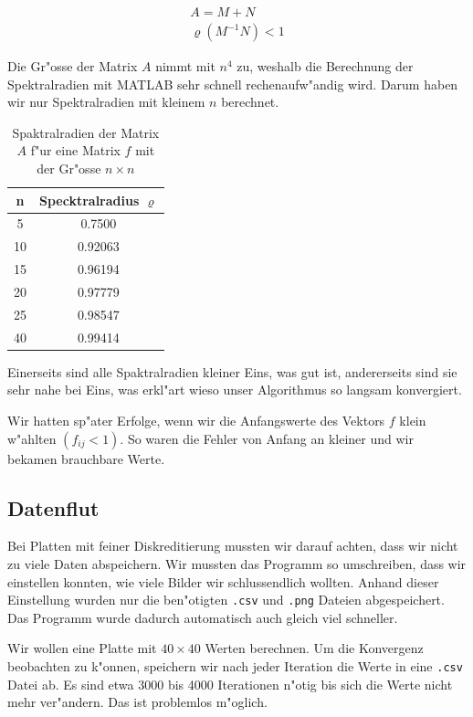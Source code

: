 \begin{refsection}
\begin{eqnarray}
A = M+N\\
\varrho(M^{-1}N)<1
\end{eqnarray}
		
Die Gr"osse der Matrix $A$ nimmt mit $n^4$ zu, weshalb die Berechnung
der Spektralradien mit MATLAB sehr schnell rechenaufw"andig wird.
Darum haben wir nur Spektralradien mit kleinem $n$ berechnet.
		
\begin{table}
\begin{tabular}{cc}
n & Specktralradius $\varrho$\\\hline
5 & 0.7500\\
10 & 0.92063\\
15 & 0.96194\\
20 & 0.97779\\
25 & 0.98547\\
40 & 0.99414
\end{tabular}
\centering
\caption{Spaktralradien der Matrix $A$ f"ur eine Matrix $f$ mit der Gr"osse $n\times n$}
\end{table}
	
Einerseits sind alle Spaktralradien kleiner Eins, was gut ist,
andererseits sind sie sehr nahe bei Eins, was erkl"art wieso unser
Algorithmus so langsam konvergiert.
		
Wir hatten sp"ater Erfolge, wenn wir die Anfangswerte des Vektors
$f$ klein w"ahlten $(f_{ij}<1)$. So waren die Fehler von Anfang an
kleiner und wir bekamen brauchbare Werte.
	
\subsection{Datenflut}
	
Bei Platten mit feiner Diskreditierung mussten wir darauf achten,
dass wir nicht zu viele Daten abspeichern. Wir mussten das Programm
so umschreiben, dass wir einstellen konnten, wie viele Bilder wir
schlussendlich wollten. Anhand dieser Einstellung wurden nur
die ben"otigten \texttt{.csv} und \texttt{.png} Dateien abgespeichert.
Das Programm wurde dadurch automatisch auch gleich viel schneller.
		
\begin{beispiel}
Wir wollen eine Platte mit  $40 \times 40$ Werten berechnen. Um die
Konvergenz beobachten zu k"onnen, speichern wir nach jeder Iteration
die Werte in eine \texttt{.csv} Datei ab. Es sind etwa 3000 bis 4000 Iterationen
n"otig bis sich die Werte nicht mehr ver"andern. Das ist problemlos m"oglich.
			

\end{beispiel}
\end{refsection}
